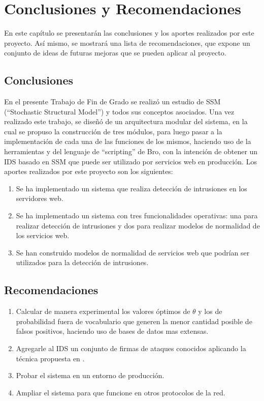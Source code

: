 \chapter{Conclusiones y Recomendaciones}
\label{conclusiones}

En este capítulo se presentarán las conclusiones y los aportes realizados por este proyecto. Así mismo, se mostrará una lista de recomendaciones, que expone un conjunto de ideas de futuras mejoras que se pueden aplicar al proyecto.

\section{Conclusiones}

En el presente Trabajo de Fin de Grado se realizó un estudio de SSM (``Stochastic Structural Model'') \cite{ssm} y todos sus conceptos asociados. Una vez realizado este trabajo, se diseñó de un arquitectura modular del sistema, en la cual se propuso la construcción de tres módulos, para luego pasar a la
implementación de cada una de las funciones de los mismos, haciendo uso de la herramientas y del lenguaje de ``scripting'' de Bro, con la intención de obtener un IDS basado en SSM que puede ser utilizado por servicios web en
producción. Los aportes realizados por este proyecto son los siguientes:

\begin{enumerate}
\item Se ha implementado un sistema que realiza detección de intrusiones en los servidores web.
\item Se ha implementado un sistema con tres funcionalidades operativas: una para realizar detección de intrusiones y dos para realizar modelos de normalidad de los servicios web.
\item Se han construido modelos de normalidad de servicios web que podrían ser utilizados para la detección de intrusiones.
\end{enumerate}

\section{Recomendaciones}

\begin{enumerate}
\item Calcular de manera experimental los valores óptimos de $\theta$ y los de probabilidad fuera de vocabulario que generen la menor cantidad posible de falsos positivos, haciendo uso de bases de datos mas extensas.
\item Agregarle al IDS un conjunto de firmas de ataques conocidos aplicando la técnica propuesta en \cite{firmas}.
\item Probar el sistema en un entorno de producción.
\item Ampliar el sistema para que funcione en otros protocolos de la red.
\end{enumerate}
